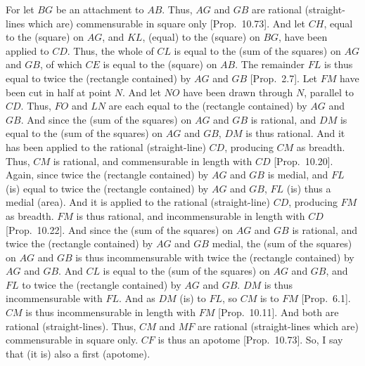 For let $BG$ be an attachment to $AB$. Thus, $AG$ and $GB$
are rational (straight-lines which are) commensurable in square only
[Prop.~10.73]. And let $CH$, equal to the
(square) on $AG$, and $KL$, (equal) to the (square) on $BG$, have been applied to $CD$. Thus, the whole of $CL$ is equal to the (sum of the
squares) on $AG$ and $GB$, of which $CE$ is equal to the (square) on
$AB$. The remainder $FL$ is thus equal to twice the (rectangle contained)
by $AG$ and $GB$ [Prop.~2.7]. Let $FM$
have been cut in half at point $N$. And let $NO$ have been drawn
through $N$, parallel to $CD$. Thus, $FO$ and $LN$ are each equal to
the (rectangle contained) by $AG$ and $GB$. And since the (sum of the
squares) on $AG$ and $GB$ is rational, and $DM$ is equal to the (sum of the squares) on
$AG$ and $GB$, $DM$ is thus rational. And it has
been applied to the rational (straight-line) $CD$, producing $CM$ as breadth. Thus, $CM$
is rational, and commensurable in length with $CD$ [Prop.~10.20]. Again, since twice the
(rectangle contained) by $AG$ and $GB$ is medial, and $FL$
(is) equal to twice the (rectangle contained) by $AG$ and $GB$, $FL$
(is) thus a medial (area). And it is applied to the rational (straight-line)
$CD$, producing $FM$ as breadth. $FM$ is thus rational, and
incommensurable in  length with $CD$ [Prop.~10.22]. And since the (sum of the
squares) on $AG$ and $GB$ is rational, and twice the (rectangle contained)
by $AG$ and $GB$ medial, the (sum of the squares) on
$AG$ and $GB$ is thus incommensurable with twice the (rectangle
contained) by $AG$ and $GB$. And $CL$ is equal to the (sum of the
squares) on $AG$ and $GB$, and $FL$ to twice the (rectangle contained)
by $AG$ and $GB$. $DM$ is thus incommensurable with $FL$.
And as $DM$ (is) to $FL$, so $CM$ is to $FM$ [Prop.~6.1]. $CM$ is thus incommensurable in length
with $FM$ [Prop.~10.11]. And both are rational 
(straight-lines). Thus, $CM$ and $MF$ are rational (straight-lines
which are) commensurable in square only. $CF$ is thus an apotome
[Prop.~10.73]. So, I say that
(it is) also a first (apotome).


